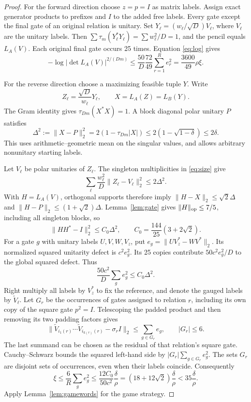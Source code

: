 \documentclass[11pt,a4paper]{article}
\newcommand{\norm}[1]{\lVert#1\rVert}
\begin{document}
\begin{proof}
For the forward direction choose $z=p=I$ as matrix labels. Assign exact generator products to prefixes and $I$ to the added free labels. Every gate except the final gate of an original relation is unitary. Set $Y_\ell=(w_\ell/\sqrt D)V_\ell$, where $V_\ell$ are the unitary labels. Then $\sum\tau_m(Y_\ell^*Y_\ell)=\sum w_\ell^2/D=1$, and the pencil equals $L_A(V)$. Each original final gate occurs 25 times. Equation \eqref{eq:log} gives
\[
 -\log\left|\det L_A(V)\right|^{2/(Dm)}
 \le\frac{50}{D}\frac{72}{49}
       \sum_{r=1}^R e_r^2
 =\frac{3600}{49}\rho\xi .
\]

For the reverse direction choose a maximizing feasible tuple $Y$. Write
\[
 Z_\ell=\frac{\sqrt D}{w_\ell}Y_\ell,\qquad
 X=L_A(Z)=L_B(Y).
\]
The Gram identity gives $\tau_{Dm}(X^*X)=1$. A block diagonal polar unitary $P$ satisfies
\begin{equation}
 \Delta^2:=\norm{X-P}_2^2
 =2(1-\tau_{Dm}|X|)
 \le2(1-\sqrt{1-\delta})\le2\delta.                    \label{eq:polar}
\end{equation}
This uses arithmetic--geometric mean on the singular values, and allows arbitrary nonunitary starting labels.

Let $V_\ell$ be polar unitaries of $Z_\ell$. The singleton multiplicities in \eqref{eq:size} give
\[
 \sum_\ell\frac{w_\ell^2}{D}\norm{Z_\ell-V_\ell}_2^2
 \le2\Delta^2.
\]
With $H=L_A(V)$, orthogonal supports therefore imply
$\norm{H-X}_2\le\sqrt2\Delta$ and
$\norm{H-P}_2\le(1+\sqrt2)\Delta$. Lemma~\ref{lem:gate} gives $\norm H_{\rm op}\le7/5$, including all singleton blocks, so
\[
 \norm{HH^*-I}_2^2\le C_0\Delta^2,
 \qquad C_0=\frac{144}{25}(3+2\sqrt2).
\]
For a gate $g$ with unitary labels $U,V,W,V_z$, put $e_g=\norm{UV_z^*-WV^*}_2$. Its normalized squared unitarity defect is $c^2e_g^2$. Its 25 copies contribute $50c^2 e_g^2/D$ to the global squared defect. Thus
\[
 \frac{50c^2}{D}\sum_g e_g^2\le C_0\Delta^2.
\]
Right multiply all labels by $V_z^*$ to fix the reference, and denote the gauged labels by $\widetilde V_\ell$. Let $G_r$ be the occurrences of gates assigned to relation $r$, including its own copy of the square gate $p^2=I$. Telescoping the padded product and then removing its two padding factors gives
\[
 \norm{\widetilde V_{i_1(r)}\cdots\widetilde V_{i_{k(r)}(r)}-\sigma_r I}_2
 \le\sum_{g\in G_r}e_g,
 \qquad |G_r|\le6.
\]
The last summand can be chosen as the residual of that relation's square gate. Cauchy--Schwarz bounds the squared left-hand side by $|G_r|\sum_{g\in G_r}e_g^2$. The sets $G_r$ are disjoint sets of occurrences, even when their labels coincide. Consequently
\[
 \xi\le\frac6R\sum_g e_g^2
 \le\frac{12C_0}{50c^2}\frac{\delta}{\rho}
 =(18+12\sqrt2)\frac{\delta}{\rho}
 <35\frac{\delta}{\rho}.
\]
Apply Lemma~\ref{lem:gamewords} for the game strategy.
\end{proof}
\end{document}
